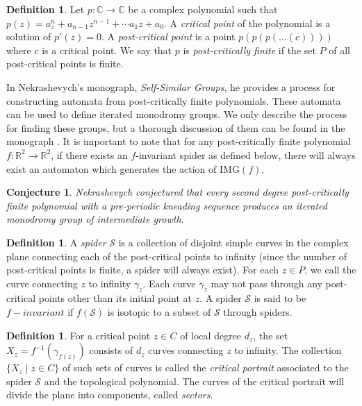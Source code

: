 \documentclass[11pt]{amsart}
\newtheorem{conjecture}[theorem]{Conjecture}
\theoremstyle{definition}
\newtheorem{definition}[theorem]{Definition}
\theoremstyle{remark}
\numberwithin{equation}{section}
\begin{document}
\begin{definition}
Let $p:\mathbb{C}\rightarrow\mathbb{C}$ be a complex polynomial such that $p(z)=a_z^n+a_{n-1}z^{n-1}+\cdots a_1z+a_0$. A \textit{critical point} of the polynomial is a solution of $p'(z)=0$.  A \textit{post-critical point} is a point $p(p(p(\ldots(c))))$ where $c$ is a critical point.  We say that $p$ is \textit{post-critically finite} if the set $P$ of all post-critical points is finite. 
\end{definition}


In Nekrashevych's monograph, \textit{Self-Similar Groups}, he provides a process for constructing automata from post-critically finite polynomials. These automata can be used to define iterated monodromy groups. We only describe the process for finding these groups, but a thorough discussion of them can be found in the monograph \cite{Nekr}. It is important to note that for any post-critically finite polynomial $f : \mathbb{R}^2 \rightarrow \mathbb{R}^2$, if there exists an $f$-invariant spider as defined below, there will always exist an automaton which generates the action of IMG$(f)$.

\begin{conjecture}
Nekrashevych conjectured that every second degree post-critically finite polynomial with a pre-periodic kneading sequence produces an iterated monodromy group of intermediate growth.\\
\end{conjecture}


\begin{definition}
A \textit{spider} $\mathcal{S}$ is a collection of disjoint simple curves in the complex plane connecting each of the post-critical points to infinity (since the number of post-critical points is finite, a spider will always exist). For each $z\in P$, we call the curve connecting $z$ to infinity $\gamma_z$. Each curve $\gamma_z$ may not pass through any post-critical points other than its initial point at $z$. A spider $\mathcal{S}$ is said to be $f-invariant$ if $f(\mathcal{S})$ is isotopic to a subset of $\mathcal{S}$ through spiders.\end{definition}
\begin{definition}
\indent For a critical point $z\in C$ of local degree $d_z$, the set $X_z=f^{-1}(\gamma_{f(z)})$ consists of $d_z$ curves connecting $z$ to infinity. The collection $\{X_z \mid z\in C\}$ of such sets of curves is called the \textit{critical portrait} associated to the spider $\mathcal{S}$ and the topological polynomial. The curves of the critical portrait will divide the plane into components, called \textit{sectors}.
\end{definition}
\end{document}
